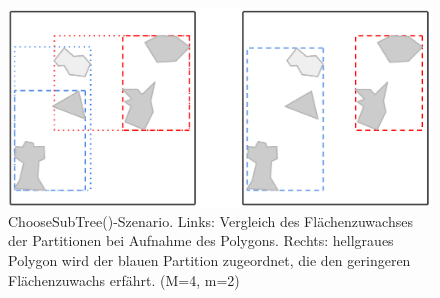 \documentclass[runningheads,a4paper]{llncs}
\begin{document}
\begin{figure}[H]
		\begin{center}
		\includegraphics[width=1.0\textwidth ]{002_Beispiel_Choose_SubTree.pdf}
		\caption{ChooseSubTree()-Szenario. Links: Vergleich des Flächenzuwachses der Partitionen bei Aufnahme des Polygons. Rechts: hellgraues Polygon wird der blauen Partition zugeordnet, die den geringeren Flächenzuwachs erfährt. (\acs{M}=4, \acs{m}=2)}
		\label{fig:beispiel-choose-subtree}
		\end{center}
	\end{figure}
\end{document}
